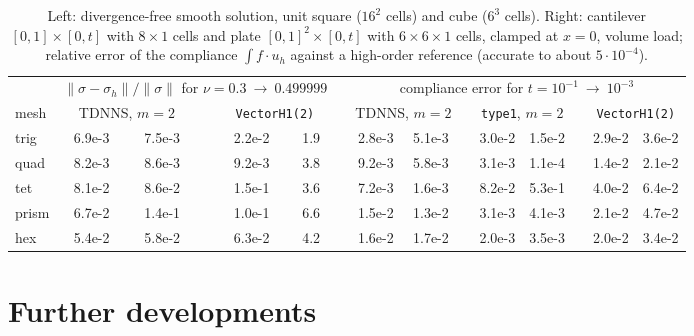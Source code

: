 \documentclass[10pt,a4paper]{article}
\newcommand{\code}[1]{\texttt{#1}}
\begin{document}
\begin{table}[h]\centering\footnotesize\setlength{\tabcolsep}{4pt}
\begin{tabular}{@{}l cc c cc c cc c cc c cc@{}}\toprule
 & \multicolumn{5}{c}{$\|\sigma-\sigma_h\|/\|\sigma\|$ for $\nu=0.3\ \to\ 0.499999$} && \multicolumn{8}{c}{compliance error for $t=10^{-1}\ \to\ 10^{-3}$}\\
 mesh & \multicolumn{2}{c}{TDNNS, $m=2$} && \multicolumn{2}{c}{\code{VectorH1(2)}} && \multicolumn{2}{c}{TDNNS, $m=2$} && \multicolumn{2}{c}{\code{type1}, $m=2$} && \multicolumn{2}{c}{\code{VectorH1(2)}}\\\midrule
 trig  & 6.9e-3 & 7.5e-3 && 2.2e-2 & 1.9 && 2.8e-3 & 5.1e-3 && 3.0e-2 & 1.5e-2 && 2.9e-2 & 3.6e-2\\
 quad  & 8.2e-3 & 8.6e-3 && 9.2e-3 & 3.8 && 9.2e-3 & 5.8e-3 && 3.1e-3 & 1.1e-4 && 1.4e-2 & 2.1e-2\\
 tet   & 8.1e-2 & 8.6e-2 && 1.5e-1 & 3.6 && 7.2e-3 & 1.6e-3 && 8.2e-2 & 5.3e-1 && 4.0e-2 & 6.4e-2\\
 prism & 6.7e-2 & 1.4e-1 && 1.0e-1 & 6.6 && 1.5e-2 & 1.3e-2 && 3.1e-3 & 4.1e-3 && 2.1e-2 & 4.7e-2\\
 hex   & 5.4e-2 & 5.8e-2 && 6.3e-2 & 4.2 && 1.6e-2 & 1.7e-2 && 2.0e-3 & 3.5e-3 && 2.0e-2 & 3.4e-2\\\bottomrule
\end{tabular}
\caption{Left: divergence-free smooth solution, unit square ($16^2$ cells) and cube ($6^3$ cells). Right: cantilever $[0,1]\times[0,t]$ with $8\times1$ cells and plate $[0,1]^2\times[0,t]$ with $6\times6\times1$ cells, clamped at $x=0$, volume load; relative error of the compliance $\int f\cdot u_h$ against a high-order reference (accurate to about $5\cdot10^{-4}$).}\label{tab:robust}
\end{table}

\section{Further developments}
\end{document}
